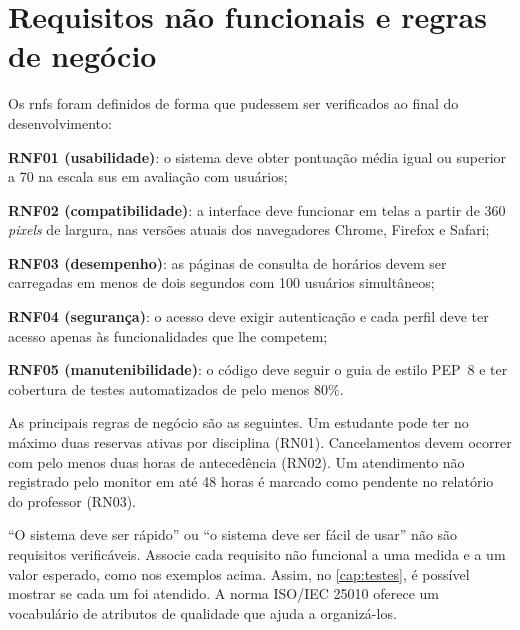 \section{Requisitos não funcionais e regras de negócio}
\label{sec:requisitos:naofuncionais}

Os \acp{rnf} foram definidos de forma que pudessem ser verificados ao final do
desenvolvimento:
\begin{alineas}
  \item \textbf{RNF01 (usabilidade)}: o sistema deve obter pontuação média
        igual ou superior a 70 na escala \acs{sus} em avaliação com usuários;
  \item \textbf{RNF02 (compatibilidade)}: a interface deve funcionar em
        telas a partir de 360 \emph{pixels} de largura, nas versões atuais dos
        navegadores Chrome, Firefox e Safari;
  \item \textbf{RNF03 (desempenho)}: as páginas de consulta de horários devem
        ser carregadas em menos de dois segundos com 100 usuários simultâneos;
  \item \textbf{RNF04 (segurança)}: o acesso deve exigir autenticação e cada
        perfil deve ter acesso apenas às funcionalidades que lhe competem;
  \item \textbf{RNF05 (manutenibilidade)}: o código deve seguir o guia de
        estilo PEP~8 \cite{vanrossum2001pep8} e ter cobertura de testes
        automatizados de pelo menos 80\%.
\end{alineas}

As principais regras de negócio são as seguintes. Um estudante pode ter no
máximo duas reservas ativas por disciplina (RN01). Cancelamentos devem ocorrer
com pelo menos duas horas de antecedência (RN02). Um atendimento não
registrado pelo monitor em até 48 horas é marcado como pendente no relatório
do professor (RN03).

\begin{instrucao}
``O sistema deve ser rápido'' ou ``o sistema deve ser fácil de usar'' não são
requisitos verificáveis. Associe cada requisito não funcional a uma medida e
a um valor esperado, como nos exemplos acima. Assim, no \cref{cap:testes}, é
possível mostrar se cada um foi atendido. A norma ISO/IEC 25010 oferece um
vocabulário de atributos de qualidade que ajuda a organizá-los.
\end{instrucao}

